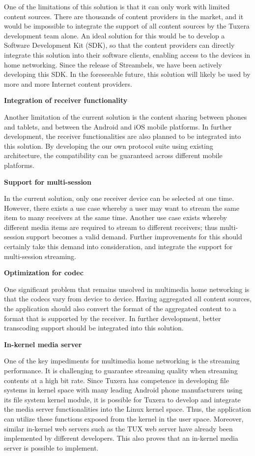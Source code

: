 One of the limitations of this solution is that it can only work with limited
content sources. There are thousands of content providers in the market, and it
would be impossible to integrate the support of all content sources by the
Tuxera development team alone. An ideal solution for this would be to develop a
Software Development Kit (SDK), so that the content providers can directly
integrate this solution into their software clients, enabling access to the
devices in home networking. Since the release of Streambels, we have been
actively developing this SDK. In the foreseeable future, this solution will
likely be used by more and more Internet content providers.

\textbf{Integration of receiver functionality}

Another limitation of the current solution is the content sharing between
phones and tablets, and between the Android and iOS mobile platforms.
In further development, the receiver functionalities are also planned to be
integrated into this solution. By developing the our own protocol suite using
existing architecture, the compatibility can be guaranteed across different
mobile platforms.

\textbf{Support for multi-session}

In the current solution, only one receiver device can be selected at one
time. However, there exists a use case whereby a user may want to stream the
same item to many receivers at the same time. Another use case exists
whereby different media items are required to stream to different receivers;
thus multi-session support becomes a valid demand. Further improvements
for this should certainly take this demand into consideration, and integrate the
support for multi-session streaming.

\textbf{Optimization for codec}

One significant problem that remains unsolved in multimedia home networking is
that the codecs vary from device to device. Having aggregated all content
sources, the application should also convert the format of the aggregated
content to a format that is supported by the receiver. In further development,
better transcoding support should be integrated into this solution.

\textbf{In-kernel media server}

One of the key impediments for multimedia home networking is the streaming
performance. It is challenging to guarantee streaming quality when streaming
contents at a high bit rate. Since Tuxera has competence in developing file
systems in kernel space with many leading Android phone manufacturers using its
file system kernel module, it is possible for Tuxera to develop and integrate
the media server functionalities into the Linux kernel space. Thus, the
application can utilize these functions exposed from the kernel in the user
space. Moreover, similar in-kernel web servers such as the TUX web server
\cite{tux_webserver} have already been implemented by different developers.
This also proves that an in-kernel media server is possible to implement.
